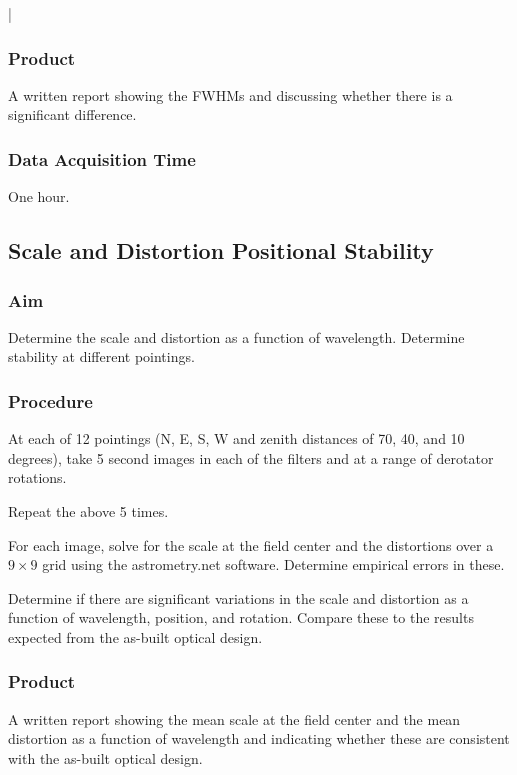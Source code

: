 |\documentclass{article}
\begin{document}
\subsubsection{Product}

A written report showing the FWHMs and discussing whether there is a significant difference.

\subsubsection{Data Acquisition Time}

One hour.


\subsection{Scale and Distortion Positional Stability}

\subsubsection{Aim}

Determine the scale and distortion  as a function of wavelength. Determine stability at different pointings.

\subsubsection{Procedure}

At each of 12 pointings (N, E, S, W and zenith distances of 70, 40, and 10 degrees), take 5 second images in each of the filters and at a range of derotator rotations. 

Repeat the above 5 times.

For each image, solve for the scale at the field center and the distortions over a $9\times9$ grid using the astrometry.net software. Determine empirical errors in these.

Determine if there are significant variations in the scale and distortion as a function of wavelength, position, and rotation. Compare these to the results expected from the as-built optical design.

\subsubsection{Product}

A written report showing the mean scale at the field center and the mean distortion as a function of wavelength and indicating whether these are consistent with the as-built optical design.
\end{document}
